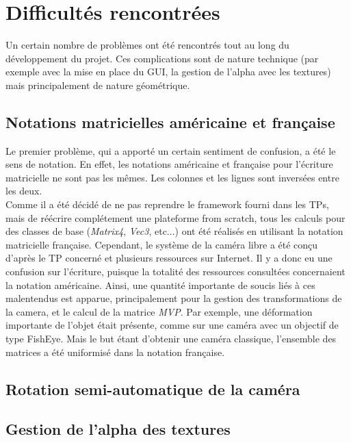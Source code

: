 \chapter{Difficultés rencontrées}

Un certain nombre de problèmes ont été rencontrés tout au long du développement
du projet. Ces complications sont de nature technique (par exemple avec la mise
en place du GUI, la gestion de l'alpha avec les textures) mais principalement de
nature géométrique.

\section{Notations matricielles américaine et française}

Le premier problème, qui a apporté un certain sentiment de confusion, a été le
sens de notation. En effet, les notations américaine et française pour
l'écriture matricielle ne sont pas les mêmes. Les colonnes et les lignes sont
inversées entre les deux.\\

Comme il a été décidé de ne pas reprendre le framework fourni dans les TPs, mais
de réécrire complétement une plateforme from scratch, tous les calculs pour des 
classes de base (\emph{Matrix4}, \emph{Vec3}, etc...) ont été réalisés en utilisant la
notation matricielle française. Cependant, le système de la caméra libre a été
conçu d'après le TP concerné et plusieurs ressources sur Internet. Il y a donc
eu une confusion sur l'écriture, puisque la totalité des ressources consultées 
concernaient la notation américaine. Ainsi, une quantité importante de soucis
liés à ces malentendus est apparue, principalement pour la gestion des
transformations de la camera, et le calcul de la matrice \emph{MVP}. Par exemple, une
déformation importante de l'objet était présente, comme sur une caméra avec un
objectif de type FishEye. Mais le but étant d'obtenir une caméra classique,
l'ensemble des matrices a été uniformisé dans la notation française.

\section{Rotation semi-automatique de la caméra}

\section{Gestion de l'alpha des textures}

